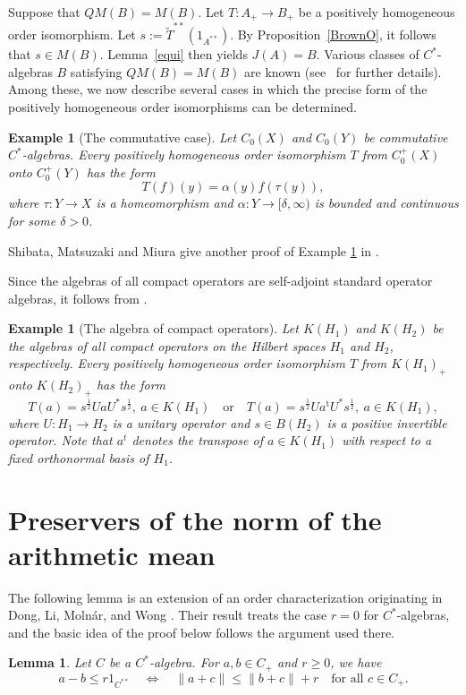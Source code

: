 \documentclass[12pt]{amsart}
\newtheorem{lemma}[theorem]{Lemma}
\newtheorem{example}[theorem]{Example}
\theoremstyle{remark}
\begin{document}
Suppose that $QM(B)=M(B)$. Let $T: A_{+} \to B_{+}$ be a positively homogeneous order isomorphism. Let $s:=\widetilde{T}^{**}(1_{A^{**}})$.  By Proposition~\ref{BrownO}, it follows that $s\in M(B)$.
Lemma~\ref{equi} then yields $J(A)=B$. Various classes of $C^*$-algebras $B$ satisfying $QM(B)=M(B)$ are known (see~\cite{BrownQM} for
further details). Among these, we now describe several cases in which the precise form
of the positively homogeneous
order isomorphisms can be determined. 
\begin{example}[The commutative case]\label{comm}
    Let $C_0(X)$ and $C_0(Y)$ be commutative $C^{*}$-algebras.  Every positively homogeneous order isomorphism $T$ from $C_0^+(X)$ onto $C_0^+(Y)$
has the form
\[
        T(f)(y)=\alpha(y)f(\tau(y)),
\]
where $\tau:Y\to X$ is a homeomorphism and $\alpha:Y\longrightarrow[\delta,\infty)$
is bounded and continuous for some $\delta>0$.
\end{example}
Shibata, Matsuzaki and Miura give another proof of Example \ref{comm} in  \cite[Theorem~1.1]{ShibataMatsuzakiMiura}. 

Since the algebras of all compact operators are self-adjoint standard operator algebras, it follows from \cite[Corollary~2]{MolnarJordan}.
\begin{example}[The algebra of compact operators]
   Let $K(H_1)$ and $K(H_2)$ be the algebras of all compact operators on the Hilbert spaces $H_1$ and $H_2$, respectively. Every positively homogeneous order isomorphism $T$ from $K(H_1)_{+}$ onto $K(H_2)_{+}$
has the form
\[
    T(a)=s^{\frac{1}{2}}UaU^*s^{\frac{1}{2}},  \  a\in K(H_1)
    \quad\text{or}\quad
    T(a)=s^{\frac{1}{2}}Ua^{\mathrm t}U^*s^{\frac{1}{2}},
    \ a\in K(H_1),
\]
where $U: H_1\to H_2$ is a unitary operator and $s \in B(H_2)$ is a positive invertible operator. Note that  $a^t$ denotes the transpose of $a \in K(H_1)$ with respect to a fixed orthonormal basis of $H_1$.
\end{example}

\section{Preservers of the norm of the arithmetic mean}
The following lemma is an  extension of an order characterization originating in Dong, Li, Molnár, and Wong \cite[Lemma~2.6]{DongLiMolnarWong}. Their result treats the case $r=0$ for $C^*$-algebras, and the basic idea of the proof below follows the argument used there. 
\begin{lemma}\label{norm0}
    Let $C$ be a $C^{*}$-algebra. For $a,b\in C_+$ and $r\geq0$, we have
   \[ a-b\leq r1_{C^{**}} \quad\Longleftrightarrow\quad \|a+c\|\leq\|b+c\|+r \quad \text{for all }c\in C_+. \] 
\end{lemma}
\end{document}
